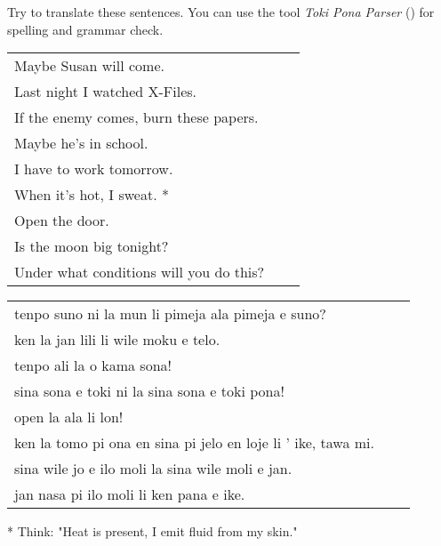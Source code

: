 Try to translate these sentences. 
You can use the tool \textit{Toki Pona Parser} (\cite{www:rowa:02}) for spelling and grammar check. 

\begin{supertabular}{p{5,5cm}|ll}
Maybe Susan will come.  && \\ %
Last night I watched X-Files.  &&   \\ %
If the enemy comes, burn these papers.  &&   \\ %
Maybe he's in school.  &&   \\ %
I have to work tomorrow.  &&   \\ %
When it's hot, I sweat. *  &&  \\ %
Open the door.   &&  \\ %
Is the moon big tonight?  &&  \\ %
Under what conditions will you do this? &&  \\ %
\end{supertabular}

\begin{supertabular}{p{5,5cm}|ll}
tenpo suno ni la mun li pimeja ala pimeja e suno? &&  \\ %
ken la jan lili li wile moku e telo.  &&   \\ %
tenpo ali la o kama sona!   &&  \\ %
sina sona e toki ni la sina sona e toki pona!   &&  \\ %
open la ala li lon! &&  \\  %
ken la tomo pi ona en sina pi jelo en loje li ' ike, tawa mi. &&  \\  %
sina wile jo e ilo moli la sina wile moli e jan. &&  \\  %
jan nasa pi ilo moli li ken pana e ike. &&  \\ %
\end{supertabular}

* Think: "Heat is present, I emit fluid from my skin."
